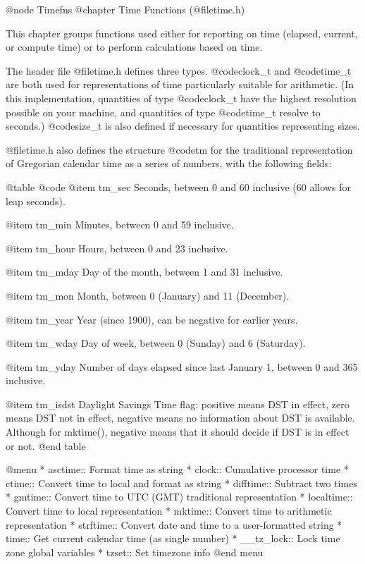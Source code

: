 @node Timefns
@chapter Time Functions (@file{time.h})

This chapter groups functions used either for reporting on time
(elapsed, current, or compute time) or to perform calculations based
on time.

The header file @file{time.h} defines three types.  @code{clock_t} and
@code{time_t} are both used for representations of time particularly
suitable for arithmetic.  (In this implementation, quantities of type
@code{clock_t} have the highest resolution possible on your machine,
and quantities of type @code{time_t} resolve to seconds.)  @code{size_t}
is also defined if necessary for quantities representing sizes.

@file{time.h} also defines the structure @code{tm} for the traditional
representation of Gregorian calendar time as a series of numbers, with
the following fields:

@table @code
@item tm_sec
Seconds, between 0 and 60 inclusive (60 allows for leap seconds).

@item tm_min
Minutes, between 0 and 59 inclusive.

@item tm_hour
Hours, between 0 and 23 inclusive.

@item tm_mday
Day of the month, between 1 and 31 inclusive.

@item tm_mon
Month, between 0 (January) and 11 (December).

@item tm_year
Year (since 1900), can be negative for earlier years.

@item tm_wday
Day of week, between 0 (Sunday) and 6 (Saturday).

@item tm_yday
Number of days elapsed since last January 1, between 0 and 365 inclusive.

@item tm_isdst
Daylight Savings Time flag: positive means DST in effect, zero means DST
not in effect, negative means no information about DST is available.
Although for mktime(), negative means that it should decide if DST is in
effect or not.
@end table

@menu
* asctime::     Format time as string
* clock::       Cumulative processor time
* ctime::       Convert time to local and format as string
* difftime::    Subtract two times
* gmtime::      Convert time to UTC (GMT) traditional representation
* localtime::   Convert time to local representation
* mktime::      Convert time to arithmetic representation
* strftime::    Convert date and time to a user-formatted string
* time::        Get current calendar time (as single number)
* __tz_lock::   Lock time zone global variables
* tzset::       Set timezone info
@end menu

